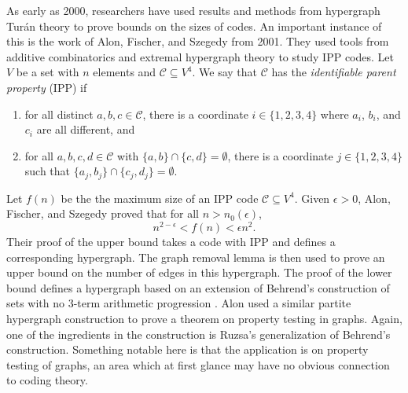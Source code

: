\documentclass[12pt]{article}%
\begin{document}
As early as 2000, researchers have used results and methods from hypergraph Tur\'{a}n theory to 
prove bounds on the sizes of codes.  An important instance of this is the work of Alon, Fischer, and Szegedy \cite{alonFischerSzegedy} from 2001.  They used tools from additive combinatorics and extremal hypergraph theory to study IPP codes.  
Let $V$ be a set with $n$ elements and $\mathcal{C} \subseteq V^4$.  We say that $\mathcal{C}$ has the \emph{identifiable parent property} (IPP) if  
\begin{enumerate}
    \item for all distinct $a,b,c \in \mathcal{C}$, there is a coordinate $i \in \{1,2,3,4 \}$ where $a_i$, $b_i$, and $c_i$ are all different, and 
    \item for all $a,b,c,d \in \mathcal{C}$ with $\{a,b \} \cap \{c , d \} = \emptyset$, there is a coordinate $j \in \{1,2,3,4 \}$ such that 
    $\{a_j , b_j \} \cap \{ c_j , d_j \} = \emptyset$.  
\end{enumerate}
Let $f(n)$ be the the maximum size of an IPP code $\mathcal{C} \subseteq V^4$.
Given $\epsilon > 0$, Alon, Fischer, and Szegedy proved that for all $n > n_0 ( \epsilon )$, 
\begin{equation}\label{eq:alon IPP bound}
    n^{2- \epsilon } < f(n) < \epsilon n^2 .
    \end{equation}
Their proof of the upper bound takes a code with IPP and defines a corresponding hypergraph.  
The graph removal lemma \cite{alonDuke, szemeredi} is then used to prove an upper bound on the number of edges in this hypergraph.  The proof of the lower bound defines a hypergraph 
based on an extension of Behrend's construction of sets with no 3-term arithmetic progression \cite{Ruzsa}.   
Alon \cite{alon} used a similar partite hypergraph construction to prove a theorem on property testing in graphs.  Again, one of the ingredients in the construction is Ruzsa's generalization of Behrend's construction.  Something notable here is that the application is on
property testing of graphs, an area which at first glance may have no obvious connection to coding theory.  
\end{document}
